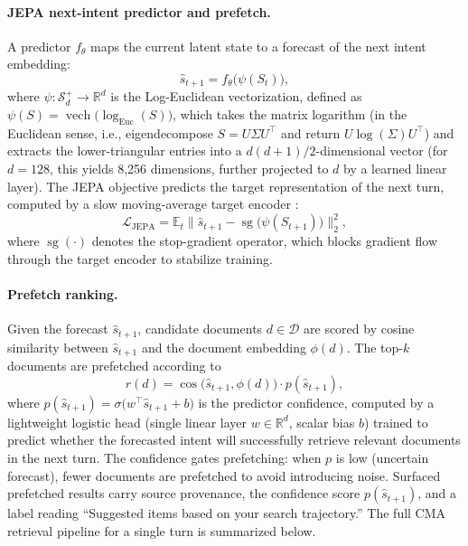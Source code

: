 \documentclass[preprint,12pt]{elsarticle}
\begin{document}
\paragraph{JEPA next-intent predictor and prefetch.} A predictor $f_\theta$ maps the current latent state to a forecast of the next intent embedding:
\begin{equation}
\hat{s}_{t+1} = f_\theta\bigl(\psi(S_t)\bigr),
\label{eq:pred}
\end{equation}
where $\psi:\mathcal{S}_d^+\to\mathbb{R}^d$ is the Log-Euclidean vectorization, defined as $\psi(S) = \operatorname{vech}\bigl(\log_{\mathrm{Euc}}(S)\bigr)$, which takes the matrix logarithm (in the Euclidean sense, i.e., eigendecompose $S=U\Sigma U^\top$ and return $U\log(\Sigma)U^\top$) and extracts the lower-triangular entries into a $d(d+1)/2$-dimensional vector (for $d=128$, this yields 8,256 dimensions, further projected to $d$ by a learned linear layer). The JEPA objective predicts the target representation of the next turn, computed by a slow moving-average target encoder \citep{assran2023_ijepa,grill20}:
\begin{equation}
\mathcal{L}_{\mathrm{JEPA}} = \mathbb{E}_t \bigl\| \hat{s}_{t+1} - \operatorname{sg}\bigl(\psi(S_{t+1})\bigr) \bigr\|_2^2,
\label{eq:jepa}
\end{equation}
where $\operatorname{sg}(\cdot)$ denotes the stop-gradient operator, which blocks gradient flow through the target encoder to stabilize training.

\paragraph{Prefetch ranking.} Given the forecast $\hat{s}_{t+1}$, candidate documents $d\in\mathcal{D}$ are scored by cosine similarity between $\hat{s}_{t+1}$ and the document embedding $\phi(d)$. The top-$k$ documents are prefetched according to
\begin{equation}
r(d) = \cos\bigl(\hat{s}_{t+1},\phi(d)\bigr) \cdot p(\hat{s}_{t+1}),
\label{eq:prefetch}
\end{equation}
where $p(\hat{s}_{t+1})=\sigma\bigl(w^\top \hat{s}_{t+1}+b\bigr)$ is the predictor confidence, computed by a lightweight logistic head (single linear layer $w\in\mathbb{R}^d$, scalar bias $b$) trained to predict whether the forecasted intent will successfully retrieve relevant documents in the next turn. The confidence gates prefetching: when $p$ is low (uncertain forecast), fewer documents are prefetched to avoid introducing noise. Surfaced prefetched results carry source provenance, the confidence score $p(\hat{s}_{t+1})$, and a label reading ``Suggested items based on your search trajectory.'' The full CMA retrieval pipeline for a single turn is summarized below.
\end{document}
